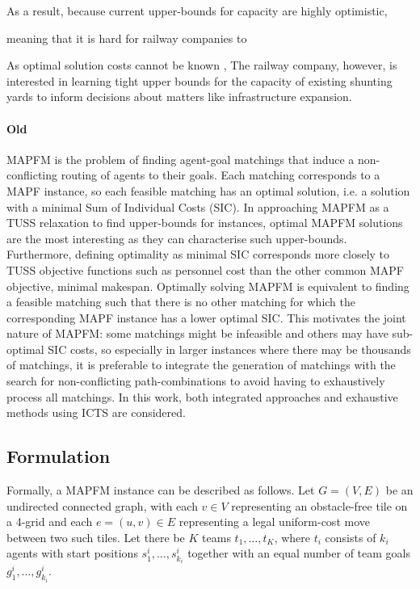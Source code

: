 \documentclass[english]{article}
\begin{document}
		As a result, because current upper-bounds for capacity are highly optimistic, 
		
		
		meaning that it is hard for railway companies to 
		
		As optimal solution costs cannot be known \cite{geiger2018}, 
		The railway company, however, is interested in learning tight upper bounds for the capacity of existing shunting yards to inform decisions about matters like infrastructure expansion. 
	\paragraph{Old}
	MAPFM is the problem of finding agent-goal matchings that induce a non-conflicting routing of agents to their goals. Each matching corresponds to a MAPF instance, so each feasible matching has an optimal solution, i.e. a solution with a minimal Sum of Individual Costs (SIC). In approaching MAPFM as a TUSS relaxation to find upper-bounds for instances, optimal MAPFM solutions are the most interesting as they can characterise such upper-bounds. Furthermore, defining optimality as minimal SIC corresponds more closely to TUSS objective functions such as personnel cost than the other common MAPF objective, minimal makespan. Optimally solving MAPFM is equivalent to finding a feasible matching such that there is no other matching for which the corresponding MAPF instance has a lower optimal SIC. This motivates the joint nature of MAPFM: some matchings might be infeasible and others may have sub-optimal SIC costs, so especially in larger instances where there may be thousands of matchings, it is preferable to integrate the generation of matchings with the search for non-conflicting path-combinations to avoid having to exhaustively process all matchings. In this work, both integrated approaches and exhaustive methods using ICTS are considered.
		
	\subsection{Formulation}
	Formally, a MAPFM instance can be described as follows. Let $G = (V,E)$ be an undirected connected graph, with each $v\in V$ representing an obstacle-free tile on a 4-grid and each $e = (u,v)\in E$ representing a legal uniform-cost move between two such tiles. Let there be $K$ teams $t_1,\ldots, t_K$, where $t_i$ consists of $k_i$ agents with start positions $s_1^i,\ldots,s_{k_i}^i$ together with an equal number of team goals $g_1^i,\ldots,g_{k_i}^i$. 
	
\end{document}
